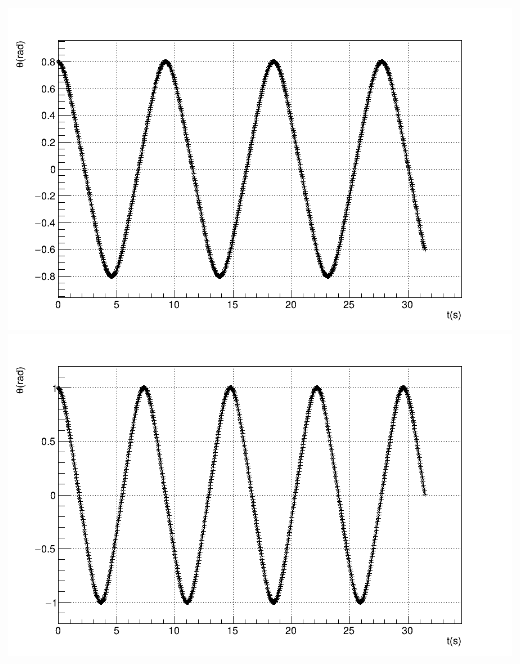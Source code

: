 \documentclass[main.tex]{subfiles}
\begin{document}
\begin{enumerate}[label=\textbf{\alph*)}]
\begin{center}
    \end{center}
    \begin{center}
        \includegraphics[scale=0.15]{../q3/alpha3/theta0.8/plots/theta_t_ec.png}
        \includegraphics[scale=0.15]{../q3/alpha3/theta1/plots/theta_t_ec.png}
    \end{center}
\end{enumerate}
\end{document}
